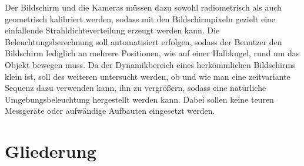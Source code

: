   Der Bildschirm und die Kameras müssen dazu sowohl radiometrisch als auch geometrisch kalibriert werden, sodass mit den Bildschirmpixeln gezielt eine einfallende Strahldichteverteilung erzeugt werden kann.
  Die Beleuchtungsberechnung  soll automatisiert erfolgen,  sodass der Benutzer den Bildschirm lediglich an mehrere Positionen, wie auf einer Halbkugel, rund um das Objekt bewegen muss.
  Da der Dynamikbereich eines herkömmlichen Bildschirms klein ist, soll des weiteren untersucht werden, ob und wie man eine zeitvariante Sequenz dazu verwenden kann, ihn zu vergrößern, sodass eine natürliche Umgebungsbeleuchtung hergestellt werden kann.
  Dabei sollen keine teuren Messgeräte oder aufwändige  Aufbauten eingesetzt werden.

  
\section{Gliederung}  \label{gliederung}
  
